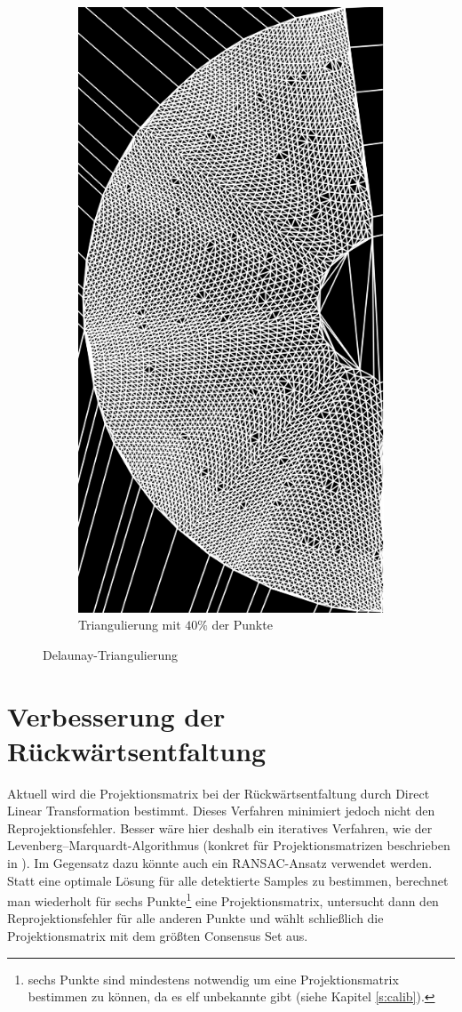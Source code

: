 \begin{figure}[!htb]
\begin{subfigure}{.9\textwidth}
		\includegraphics[angle=-90, width=.8\textwidth]{images/delaunay2.png}
		\caption{Triangulierung mit $40\%$ der Punkte}
	\end{subfigure}
	\caption{Delaunay-Triangulierung}
	\label{fig:delaunayTriag}
\end{figure}


\section{Verbesserung der Rückwärtsentfaltung}
Aktuell wird die Projektionsmatrix bei der Rückwärtsentfaltung durch Direct Linear Transformation bestimmt. Dieses Verfahren minimiert jedoch nicht den Reprojektionsfehler. Besser wäre hier deshalb ein iteratives Verfahren, wie der Levenberg–Marquardt-Algorithmus (konkret für Projektionsmatrizen beschrieben in \cite{Hartley2000}).
Im Gegensatz dazu könnte auch ein RANSAC-Ansatz verwendet werden. Statt eine optimale Lösung für alle detektierte Samples zu bestimmen, berechnet man wiederholt für sechs Punkte\footnote{sechs Punkte sind mindestens notwendig um eine Projektionsmatrix bestimmen zu können, da es elf unbekannte gibt (siehe Kapitel \ref{s:calib}).} eine Projektionsmatrix, untersucht dann den Reprojektionsfehler für alle anderen Punkte und wählt schließlich die Projektionsmatrix mit dem größten Consensus Set aus.


